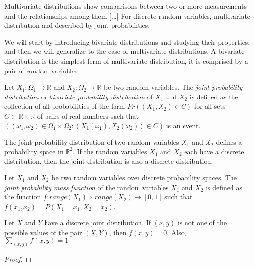 {\color{red} Multivariate distributions show comparisons between two or more measurements and the relationships among them [...]  For discrete random variables, multivariate distribution and described by joint probabilities.}

We will start by introducing bivariate distributions and studying their properties, and then we will generalize to the case of multivariate distributions. A bivariate distribution is the simplest form of multivariate distribution, it is comprised by a pair of random variables.

\begin{definition}
Let $X_1 : \Omega_1 \rightarrow \mathbb{R}$ and $X_2 : \Omega_2 \rightarrow \mathbb{R}$ be two random variables. The \emph{joint probability distribution} or \emph{bivariate probability distribution} of $X_1$ and $X_2$ is defined as the collection of all probabilities of the form $Pr\left( \left( X_1, X_2 \right) \in C \right)$ for all sets $C \subset \mathbb{R} \times \mathbb{R}$ of pairs of real numbers such that $\left( \left( \omega_1, \omega_2 \right) \in \Omega_1 \times \Omega_2: \left( X_1 \left( \omega_1 \right), X_2 \left( \omega_2 \right) \right) \in C \right)$ is an event.
\end{definition}

The joint probability distribution of two random variables $X_1$ and $X_2$ defines a probability space in $\mathbb{R}^2$. If the random variables $X_1$ and $X_2$ each have a discrete distribution, then the joint distribution is also a discrete distribution.

\begin{definition}
Let $X_1$ and $X_2$ be two random variables over discrete probability spaces. The \emph{joint probability mass function} of the random variables $X_1$ and $X_2$ is defined as the function $f : range \left( X_1 \right) \times range \left( X_2 \right) \rightarrow [0, 1]$ such that $f \left( x_1, x_2 \right) = P \left( X_1 = x_1, X_2 = x_2 \right)$.
\end{definition}

\begin{proposition}
Let $X$ and $Y$ have a discrete joint distribution. If $\left(x,y\right)$ is not one of the possible values of the pair $\left(X,Y\right)$, then $f\left(x,y\right)=0$. Also, $\sum_{\left(x,y\right)}f\left(x,y\right)=1$
\end{proposition}
\begin{proof}
\end{proof}

